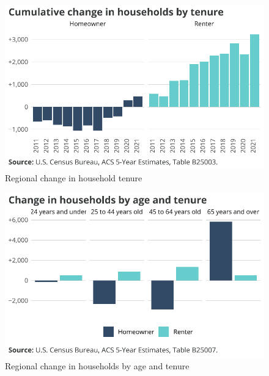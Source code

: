 \documentclass[
  letterpaper,
  DIV=11,
  numbers=noendperiod]{scrreprt}
\begin{document}
\begin{figure}[H]

{\centering \includegraphics{./part-3-1_files/figure-pdf/fig-tenure-1.pdf}

}

\caption{\label{fig-tenure}Regional change in household tenure}

\end{figure}

\begin{figure}[H]

{\centering \includegraphics{./part-3-1_files/figure-pdf/fig-age-1.pdf}

}

\caption{\label{fig-age}Regional change in households by age and tenure}

\end{figure}
\end{document}
